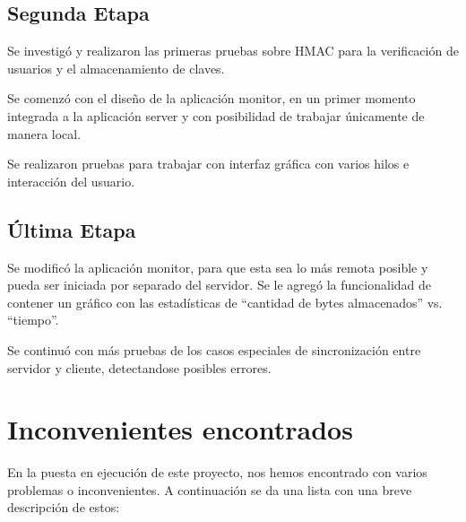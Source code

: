 \documentclass{article}
\begin{document}
\subsection{Segunda Etapa}
\smallskip

	Se investigó y realizaron las primeras pruebas sobre HMAC para la verificación de usuarios y el almacenamiento de claves.
	\par
	Se comenzó con el diseño de la aplicación monitor, en un primer momento integrada a la aplicación server y con posibilidad de trabajar únicamente de manera local.
	\par
	Se realizaron pruebas para trabajar con interfaz gráfica con varios hilos e interacción del usuario.
\bigskip


\subsection{Última Etapa}
\smallskip

	Se modificó la aplicación monitor, para que esta sea lo más remota posible y pueda ser iniciada por separado del servidor. Se le agregó la funcionalidad de contener un gráfico con las estadísticas de “cantidad de bytes almacenados” vs. “tiempo”.
	\par
	Se continuó con más pruebas de los casos especiales de sincronización entre servidor y cliente, detectandose posibles errores. 
\bigskip\medskip




\section{Inconvenientes encontrados}

	En la puesta en ejecución de este proyecto, nos hemos encontrado con varios problemas o inconvenientes. A continuación se da una lista con una breve descripción de estos:
\end{document}
